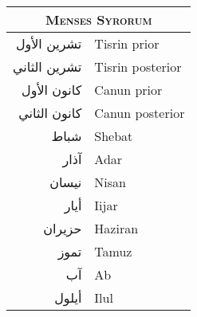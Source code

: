 %
\footnotesize
\centering
\begin{tabular}{@{}r l@{}}
\toprule
 \multicolumn{2}{c}{\Large\textsc{Menses Syrorum}}\\
\midrule
 \textarabic{تشرين الأول} &
 Tisrin prior
\\
 \textarabic{تشرين الثاني} &
 Tisrin posterior
\\
 \textarabic{كانون الأول} &
 Canun prior
\\
\midrule
 \textarabic{كانون الثاني} &
 Canun posterior
\\
 \textarabic{شباط} &
 Shebat
\\
 \textarabic{آذار} &
 Adar
\\
\midrule
 \textarabic{نيسان} &
 Nisan
\\
 \textarabic{أيار} &
 Iijar
\\
 \textarabic{حزيران} &
 Haziran
\\
\midrule
 \textarabic{تموز} &
 Tamuz
\\
 \textarabic{آب} &
 Ab
\\
 \textarabic{أيلول} &
 Ilul
\\
\bottomrule
\end{tabular}
%
